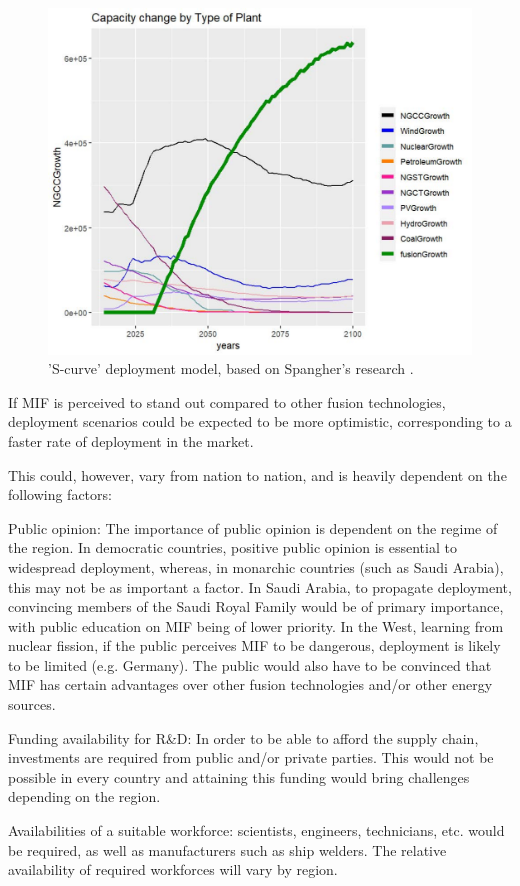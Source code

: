 \begin{figure}[h!]
    \centering
    \includegraphics[width =0.65\linewidth]{SubreportFigures/spangher_default.pdf}
    \caption{'S-curve' deployment model, based on Spangher's research \cite{spangher2019characterizing}. }
    \label{fig:spangher_gdp}
\end{figure}

If MIF is perceived to stand out compared to other fusion technologies, deployment scenarios could be expected to be more optimistic, corresponding to a  faster rate of deployment in the market. 

This could, however, vary from nation to nation, and is heavily dependent on the following factors: 

Public opinion: The importance of public opinion is dependent on the regime of the region. In democratic countries, positive public opinion is essential to widespread deployment, whereas, in monarchic countries (such as Saudi Arabia), this may not be as important a factor. In Saudi Arabia, to propagate deployment, convincing members of the Saudi Royal Family would be of primary importance, with public education on  MIF being of lower priority. In the West, learning from nuclear fission, if the public perceives MIF to be dangerous, deployment is likely to be limited (e.g. Germany). The public would also have to be convinced that MIF has certain advantages over other fusion technologies and/or other energy sources.

Funding availability for R\&D: In order to be able to afford the supply chain, investments are required from public and/or private parties. This would not be possible in every country and attaining this funding would bring challenges depending on the region. 

Availabilities of a suitable workforce: scientists, engineers, technicians, etc. would be required, as well as manufacturers such as ship welders. The relative availability of required workforces will vary by region.

